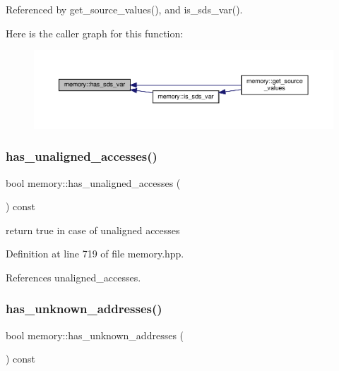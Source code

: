 Referenced by get\+\_\+source\+\_\+values(), and is\+\_\+sds\+\_\+var().

Here is the caller graph for this function\+:
\nopagebreak
\begin{figure}[H]
\begin{center}
\leavevmode
\includegraphics[width=350pt]{d8/d99/classmemory_a9d3f4a7583446c2617160ac93f7ccb27_icgraph}
\end{center}
\end{figure}
\mbox{\label{classmemory_a4cfc9a502338a2d4ba7c831c63e41edf}} 
\subsubsection{\texorpdfstring{has\+\_\+unaligned\+\_\+accesses()}{has\_unaligned\_accesses()}}
{\footnotesize\ttfamily bool memory\+::has\+\_\+unaligned\+\_\+accesses (\begin{DoxyParamCaption}{ }\end{DoxyParamCaption}) const\hspace{0.3cm}{\ttfamily [inline]}}



return true in case of unaligned accesses 



Definition at line 719 of file memory.\+hpp.



References unaligned\+\_\+accesses.

\mbox{\label{classmemory_a90adcbcfd3399dad6ff8ef90c6ad9a35}} 
\subsubsection{\texorpdfstring{has\+\_\+unknown\+\_\+addresses()}{has\_unknown\_addresses()}}
{\footnotesize\ttfamily bool memory\+::has\+\_\+unknown\+\_\+addresses (\begin{DoxyParamCaption}{ }\end{DoxyParamCaption}) const\hspace{0.3cm}{\ttfamily [inline]}}



